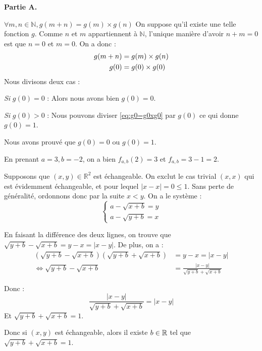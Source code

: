 \documentclass[]{../templates/homework}
\begin{document}
\textbf{Partie A.}

$\forall m, n \in \mathbb{N}, g(m + n) = g(m) \times g(n)$
\subproblem
On suppose qu'il existe une telle fonction $g$.
\question
Comme $n$ et $m$ appartiennent à $\mathbb{N}$, l'unique manière d'avoir $n + m = 0$ est que $n = 0$ et $m = 0$.
On a donc :
\begin{align}
	g(m + n) &= g(m) \times g(n) \notag \\
	g(0) &= g(0) \times g(0) \label{eq:g0=g0xg0}
\end{align}
Nous divisons deux cas :

\textit{Si} $g(0) = 0$ :
Alors nous avons bien $g(0) = 0$.

\textit{Si} $g(0) > 0$ :
Nous pouvons diviser \eqref{eq:g0=g0xg0} par $g(0)$ ce qui donne $g(0) = 1$.

Nous avons prouvé que $g(0) = 0$ ou $g(0) = 1$.


	\subproblem
	En prenant $a = 3, b=-2$, on a bien $f_{a,b}(2) = 3$ et $f_{a,b} = 3-1 = 2$.
	\subproblem
	
	Supposons que $(x,y) \in \mathbb R^2$ est échangeable. On exclut le cas trivial $(x,x)$ qui est évidemment échangeable, et pour lequel $|x-x| = 0 \leq 1$. Sans perte de généralité, ordonnons donc par la suite $x < y$. On a le système :
	\begin{equation*}
		\begin{cases}
			a - \sqrt{x+b} = y \\
			a - \sqrt{y+b} = x
		\end{cases}
	\end{equation*}
	
	En faisant la différence des deux lignes, on trouve que $\sqrt{y+b} - \sqrt{x+b} = y-x = |x-y|$. De plus, on a :
	\begin{equation*}
		\begin{split}
		(\sqrt{y+b} - \sqrt{x+b})(\sqrt{y+b} + \sqrt{x+b}) &=y-x = |x-y| \\
		 \iff \sqrt{y+b} - \sqrt{x+b} &= \frac {|x-y|}{\sqrt{y+b} + \sqrt{x+b}} 
		 \end{split}
	\end{equation*}
	
	Donc : $$\frac {|x-y|}{\sqrt{y+b} + \sqrt{x+b}} = |x-y|$$
	Et $\sqrt{y+b} + \sqrt{x+b} = 1$.
	
	Donc si $(x,y)$ est échangeable, alors il existe $b\in\mathbb R$ tel que $\sqrt{y+b} + \sqrt{x+b} = 1$.
	
\end{document}
